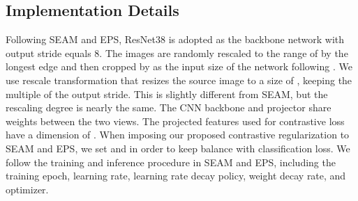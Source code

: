 \documentclass[10pt,twocolumn,letterpaper]{article}
\begin{document}
\subsection{Implementation Details}
Following SEAM and EPS, ResNet38 is adopted as the backbone network with output stride equals 8. The images are randomly rescaled to the range of  by the longest edge and then cropped by  as the input size of the network following \cite{wang2020selfSEAM}.
We use rescale transformation that resizes the source image to a size of , keeping the multiple of the output stride. This is slightly different from SEAM, but the rescaling degree is nearly the same. The CNN backbone and projector share weights between the two views. The projected features used for contrastive loss have a dimension of . When imposing our proposed contrastive regularization  to SEAM and EPS, we set  and  in order to keep balance with classification loss.
We follow the training and inference procedure in SEAM and EPS, including the training epoch, learning rate, learning rate decay policy, weight decay rate, and optimizer.
\end{document}
